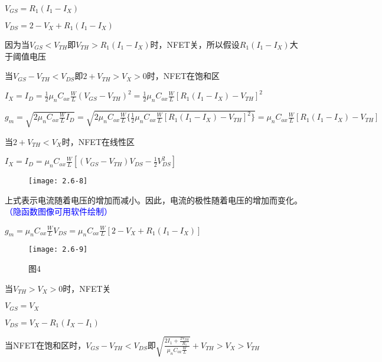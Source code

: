 {		\scalebox{3}{（d）}
	
		$V_{GS}=R_1(I_1-I_X)$
	
		$V_{DS}=2-V_{X}+R_1(I_1-I_X)$
		
		因为当$V_{GS}<V_{TH}$即$V_{TH}>R_1(I_1-I_X)$时，NFET关，所以假设$R_1(I_1-I_X)$大于阈值电压
	
		当$V_{GS}-V_{TH}<V_{DS}$即$2+V_{TH}>V_{X}>0$时，NFET在饱和区
	
	$I_X=I_D=\frac{1}{2}\mu_nC_{ox}\frac{W}{L}(V_{GS}-V_{TH})^2=\frac{1}{2}\mu_nC_{ox}\frac{W}{L}[R_1(I_1-I_X)-V_{TH}]^2$
	
	$g_m=\sqrt{2\mu_nC_{ox}\frac{W}{L}I_D}=\sqrt{2\mu_nC_{ox}\frac{W}{L}\{\frac{1}{2}\mu_nC_{ox}\frac{W}{L}[R_1(I_1-I_X)-V_{TH}]^2\}}=\mu_nC_{ox}\frac{W}{L}[R_1(I_1-I_X)-V_{TH}]$
	
	当$2+V_{TH}<V_{X}$时，NFET在线性区
	
	$I_X=I_D=\mu_nC_{ox}\frac{W}{L}[(V_{GS}-V_{TH})V_{DS}-\frac{1}{2}V_{DS}^2]$
	
			\begin{figure}[H] %
		\begin{minipage}{\linewidth}
			\texttt{[image: 2.6-8]}
		\end{minipage}
	\end{figure}
	
	上式表示电流随着电压的增加而减小。因此，电流的极性随着电压的增加而变化。\textcolor{blue}{（隐函数图像可用软件绘制）}
	
		$g_m=\mu_nC_{ox}\frac{W}{L}V_{DS}=\mu_nC_{ox}\frac{W}{L}[2-V_{X}+R_1(I_1-I_X)]$
	
			\begin{figure}[H] %
		\begin{minipage}{\linewidth}
			\texttt{[image: 2.6-9]}
		\end{minipage}
		\caption*{图4} %
	\end{figure}
	
			\scalebox{3}{（e）}
	
	当$V_{TH}>V_{X}>0$时，NFET关
	
	$V_{GS}=V_{X}$
	
	$V_{DS}=V_{X}-R_1(I_X-I_1)$
	
	当NFET在饱和区时，$V_{GS}-V_{TH}<V_{DS}$即$\sqrt{\frac{2I_1+\frac{2V_{TH}}{R_1}}{\mu_nC_{ox}\frac{W}{L}}}+V_{TH}>V_{X}>V_{TH}$
	
}

